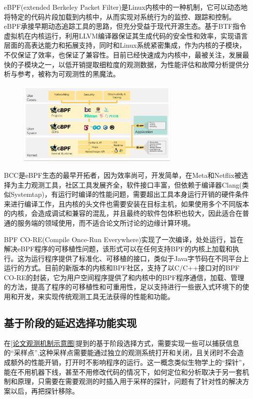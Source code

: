 \documentclass[master]{shtthesis}
\begin{document}
eBPF(extended Berkeley Packet Filter)是Linux内核中的一种机制，它可以动态地将特定的代码片段加载到内核中，从而实现对系统行为的监控、跟踪和控制。eBPF承接早期动态追踪工具的思路，但充分受益于现代开源生态。基于BTF指令虚拟机在内核运行，利用LLVM编译器保证其生成代码的安全性和效率，实现语言层面的高表达能力和拓展支持，同时和Linux系统紧密集成，作为内核的子模块，不仅保证了效率，也保证了兼容性。目前已经快速成为内核中，最被关注，发展最快的子模块之一，以低开销提取细粒度的观测数据，为性能评估和故障分析提供分析与参考，被称为可观测性的黑魔法。

\begin{figure}[htbp]
	\centering
	\includegraphics[width=8cm]{img/ebpf.png}
	\label{ebpf概览}
\end{figure}

BCC是eBPF生态的最早开拓者，因为效率尚可，开发简单，在Meta和Netflix被选择为主力观测工具，社区工具发展齐全，软件接口丰富，但依赖于编译器Clang(类似Systemtap)，有运行时编译的性能问题，需要超出工具本身运行开销的硬件条件来进行编译工作，且内核的头文件也需要安装在目标主机，如果使用多个不同版本的内核，会造成调试和兼容的混乱，并且最终的软件包体积也较大，因此适合在普通的服务端的领域使用，而不适合论文所讨论的边缘计算环境。

BPF CO-RE(Compile Once-Run Everywhere)实现了一次编译，处处运行，旨在解决eBPF程序的可移植性问题，该形式可以在任何支持BPF的内核上加载和执行。这为运行程序提供了标准化、可移植的接口，类似于Java字节码在不同平台上运行的方式。目前的新版本的内核和BPF社区，支持了以C/C++接口对的BPF CO-RE的封装，它为用户空间程序提供了和内核中的BPF程序通信，加载、管理的方法，提高了程序的可移植性和可重用性，足以支持进行一些嵌入式环境下的使用和开发，来实现传统观测工具无法获得的性能和功能。

\subsection{基于阶段的延迟选择功能实现}\label{基于阶段的延迟选择功能实现}
在\ref{论文观测机制示意图}提到的基于阶段选择方式，需要实现一些可以捕获信息的“采样点”,这种采样点需要能通过独立的观测系统打开和关闭，且关闭时不会造成额外的性能开销，打开时不影响程序的运行。这一概念类似生物学上的“探针”，能在不用机器下线，甚至不用修改代码的情况下，如何定位和分析取决于另一套机制和原理，只需要在需要观测的时插入用于采样的探针，问题有了针对性的解决方案以后，再把探针移除。
\end{document}
